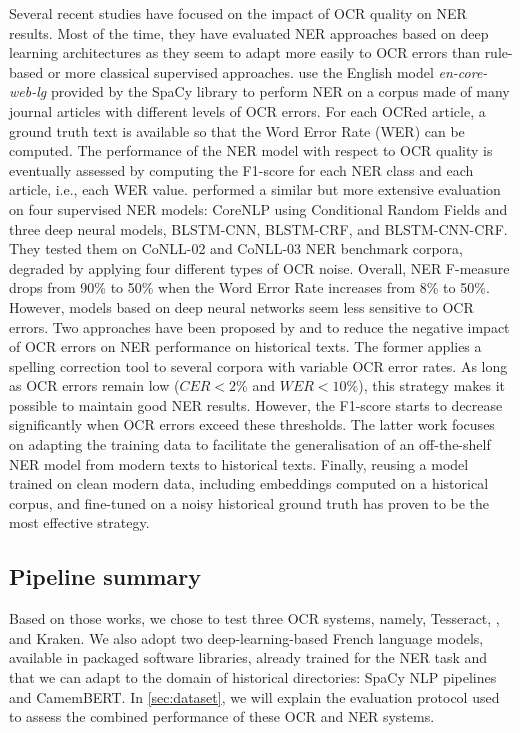 Several recent studies have focused on the impact of OCR quality on NER results. Most of the time, they have evaluated NER approaches based on deep learning architectures as they seem to adapt more easily to OCR errors than rule-based or more classical supervised approaches.
\cite{van2020assessing} use the English model \textit{en-core-web-lg} provided by the SpaCy \cite{spacy} library to perform NER on a corpus made of many journal articles with different levels of OCR errors.
For each OCRed article, a ground truth text is available so that the Word Error Rate (WER) can be computed.
The performance of the NER model with respect to OCR quality is eventually assessed by computing the F1-score for each NER class and each article, i.e., each WER value.
\cite{hamdi2020assessing} performed a similar but more extensive evaluation on four supervised NER models: CoreNLP using Conditional Random Fields and three deep neural models, BLSTM-CNN, BLSTM-CRF, and BLSTM-CNN-CRF.
They tested them on CoNLL-02 and CoNLL-03 NER benchmark corpora, degraded by applying four different types of OCR noise. Overall, NER F-measure drops from 90\% to 50\% when the Word Error Rate increases from 8\% to 50\%. However, models based on deep neural networks seem less sensitive to OCR errors. 
Two approaches have been proposed by \cite{huynh2020use} and \cite{marz2021data}  to reduce the negative impact of OCR errors on NER performance on historical texts.
The former applies a spelling correction tool to several corpora with variable OCR error rates. 
As long as OCR errors remain low ($CER<2\%$ and $WER<10\%$), this strategy makes it possible to maintain good NER results. However, the F1-score starts to decrease significantly when OCR errors exceed these thresholds.
The latter work focuses on adapting the training data to facilitate the generalisation of an off-the-shelf NER model from modern texts to historical texts.
Finally, reusing a model trained on clean modern data, including embeddings computed on a historical corpus, and fine-tuned on a noisy historical ground truth has proven to be the most effective strategy.

\subsection{Pipeline summary}
\label{sec:pipeline-summary}

Based on those works, we chose to test three OCR systems, namely, Tesseract, \peroocr, and Kraken. We also adopt two deep-learning-based French language models, available in packaged software libraries, already trained for the NER task and that we can adapt to the domain of historical directories: SpaCy NLP pipelines and CamemBERT.
In \cref{sec:dataset}, we will explain the evaluation protocol used to assess the combined performance of these OCR and NER systems. 

